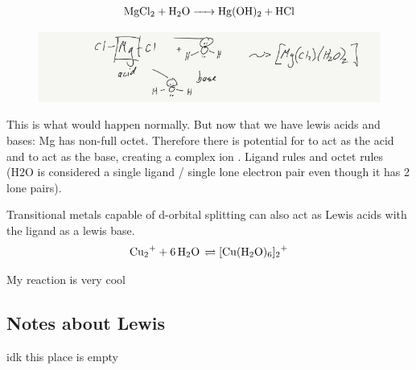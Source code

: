 \documentclass{article}
\begin{document}
$$\ce{MgCl2 + H2O -> Hg(OH)2 + HCl}$$
\begin{figure}[H]
\includegraphics[width=\textwidth]{4.3fig2.jpg}
\end{figure}
This is what would happen normally. But now that we have lewis acids and bases: Mg has non-full octet. Therefore there is potential for  to act as the acid and  to act as the base, creating a complex ion . Ligand rules and octet rules (H2O is considered a single ligand / single lone electron pair even though it has 2 lone pairs).




Transitional metals capable of d-orbital splitting can also act as Lewis acids with the ligand as a lewis base. 
$$\ce{Cu2+ + 6H2O \rightleftharpoons [Cu(H2O)6]2+}$$

My reaction is very cool



\subsection{Notes about Lewis}
idk this place is empty
\end{document}
